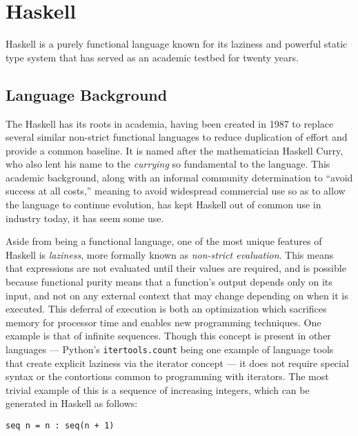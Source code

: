 \documentclass{article}
\begin{document}

\section{Haskell}

Haskell is a purely functional language known for its laziness and powerful static type system that has served as an academic testbed for twenty years.

\subsection{Language Background}

The Haskell has its roots in academia, having been created in 1987 to replace several similar non-strict functional languages to reduce duplication of effort and provide a common baseline\cite{hudak2007history}.
It is named after the mathematician Haskell Curry, who also lent his name to the \textit{currying} so fundamental to the language.
This academic background, along with an informal community determination to	``avoid success at all costs,'' meaning to avoid widespread commercial use so as to allow the language to continue evolution, has kept Haskell out of common use in industry today, it has seem some use\cite{haskellinindustry}.

Aside from being a functional language, one of the most unique features of Haskell is \textit{laziness}, more formally known as \textit{non-strict evaluation}.
This means that expressions are not evaluated until their values are required, and is possible because functional purity means that a function's output depends only on its input, and not on any external context that may change depending on when it is executed.
This deferral of execution is both an optimization which sacrifices memory for processor time and enables new programming techniques.
One example is that of infinite sequences.
Though this concept is present in other languages --- Python's \verb!itertools.count! being one example of language tools that create explicit laziness via the iterator concept\cite{pythonitertools} --- it does not require special syntax or the contortions common to programming with iterators.
The most trivial example of this is a sequence of increasing integers, which can be generated in Haskell as follows:

\begin{verbatim}
seq n = n : seq(n + 1)
\end{verbatim}
\end{document}
